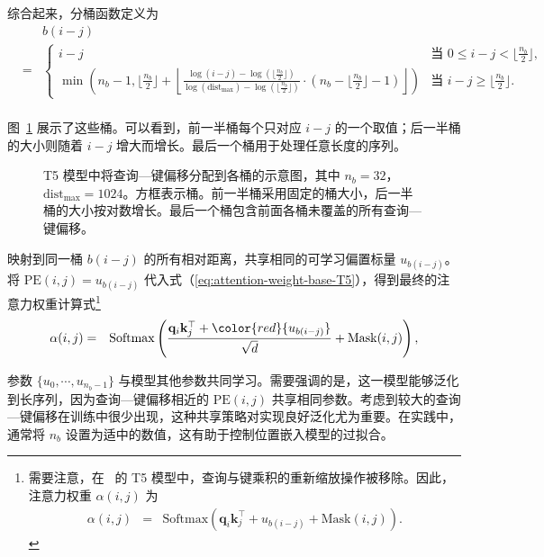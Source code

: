 综合起来，分桶函数定义为
{\small
\begin{eqnarray}
& & b(i - j) \nonumber \\
& = &
\begin{cases}
i - j & \text{当 } 0 \le i - j < \lfloor \frac{n_b}{2} \rfloor, \\
\min\left(n_b - 1, \lfloor \frac{n_b}{2} \rfloor + \left\lfloor \frac{\log(i - j) - \log(\lfloor \frac{n_b}{2} \rfloor)}{\log(\mathrm{dist}_{\mathrm{max}}) - \log(\lfloor \frac{n_b}{2} \rfloor)} \cdot \left(n_b - \lfloor \frac{n_b}{2} \rfloor - 1\right) \right\rfloor \right) & \text{当 } i - j \ge \lfloor \frac{n_b}{2} \rfloor.
\end{cases} \nonumber \\
\end{eqnarray}
}

图~\ref{fig:qk-distances-in-buckets-T5} 展示了这些桶。可以看到，前一半桶每个只对应 $i - j$ 的一个取值；后一半桶的大小则随着 $i - j$ 增大而增长。最后一个桶用于处理任意长度的序列。

\begin{figure}[!t]
\centering

\caption{T5 模型中将查询—键偏移分配到各桶的示意图，其中 $n_b = 32$，$\mathrm{dist}_{\mathrm{max}}=1024$。方框表示桶。前一半桶采用固定的桶大小，后一半桶的大小按对数增长。最后一个桶包含前面各桶未覆盖的所有查询—键偏移。}
\label{fig:qk-distances-in-buckets-T5}
\end{figure}

映射到同一桶 $b(i-j)$ 的所有相对距离，共享相同的可学习偏置标量 $u_{b(i-j)}$。将 $\mathrm{PE}(i,j) = u_{b(i-j)}$ 代入式（\ref{eq:attention-weight-base-T5}），得到最终的注意力权重计算式\footnote{需要注意，在~\citet{raffel-etal:2020exploring} 的 T5 模型中，查询与键乘积的重新缩放操作被移除。因此，注意力权重 $\alpha(i,j)$ 为
\begin{eqnarray}
\alpha(i,j) & = & \mathrm{Softmax}(\mathbf{q}_i \mathbf{k}_{j}^\top + u_{b(i-j)} + \mathrm{Mask}(i,j)).
\end{eqnarray}
}
\begin{eqnarray}
\alpha(i,j) & = & \mathrm{Softmax}\left( \frac{\mathbf{q}_i \mathbf{k}_{j}^\top + \color{red}{u_{b(i-j)}}}{\sqrt{d}} + \mathrm{Mask}(i,j) \right),
\end{eqnarray}

参数 $\{u_{0},\cdots,u_{n_b-1}\}$ 与模型其他参数共同学习。需要强调的是，这一模型能够泛化到长序列，因为查询—键偏移相近的 $\mathrm{PE}(i,j)$ 共享相同参数。考虑到较大的查询—键偏移在训练中很少出现，这种共享策略对实现良好泛化尤为重要。在实践中，通常将 $n_b$ 设置为适中的数值，这有助于控制位置嵌入模型的过拟合。

